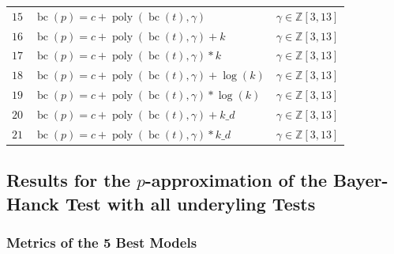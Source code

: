 \documentclass[12pt,a4paper]{article}
\DeclareMathOperator{\bc}{bc}
\DeclareMathOperator{\poly}{poly}
\begin{document}
\begin{table}
\begin{tabular}{rlc}
        \midrule
        $15$ & $\bc(p) = c + \poly\left( \bc(t), \gamma \right) $ & $\gamma \in \mathbb{Z} \left[3, 13 \right]$\\ 
        $16$ & $\bc(p) = c + \poly\left( \bc(t), \gamma \right) + k $ & $\gamma \in \mathbb{Z} \left[3, 13 \right]$\\
        $17$ & $\bc(p) = c + \poly\left( \bc(t), \gamma \right) * k $ & $\gamma \in \mathbb{Z} \left[3, 13 \right]$\\
        $18$ & $\bc(p) = c + \poly\left( \bc(t), \gamma \right) + \log(k) $ & $\gamma \in \mathbb{Z} \left[3, 13 \right]$\\
        $19$ & $\bc(p) = c + \poly\left( \bc(t), \gamma \right) * \log(k) $ & $\gamma \in \mathbb{Z} \left[3, 13 \right]$\\
        $20$ & $\bc(p) = c + \poly\left( \bc(t), \gamma \right) + k\_d $ & $\gamma \in \mathbb{Z} \left[3, 13 \right]$\\
        $21$ & $\bc(p) = c + \poly\left( \bc(t), \gamma \right) * k\_d $ & $\gamma \in \mathbb{Z} \left[3, 13 \right]$\\    
        \bottomrule
    \end{tabular}
\end{table}
\FloatBarrier

\hypertarget{results-for-the-p-approximation-of-the-bayer-hanck-test-with-all-underyling-tests}{%
\subsection{\texorpdfstring{Results for the \(p\)-approximation of the
Bayer-Hanck Test with all underyling
Tests}{Results for the p-approximation of the Bayer-Hanck Test with all underyling Tests}}\label{results-for-the-p-approximation-of-the-bayer-hanck-test-with-all-underyling-tests}}

\hypertarget{metrics-of-the-5-best-models}{%
\subsubsection{Metrics of the 5 Best
Models}\label{metrics-of-the-5-best-models}}
\end{document}
